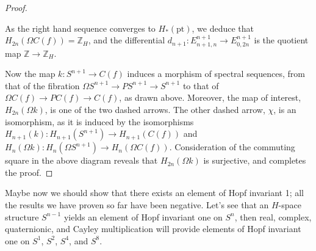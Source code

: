 \documentclass{article}
\newcommand{\Z}{\mathbb{Z}}
\newcommand{\ptspace}{\mathrm{pt}}
\newcommand{\Loops}{\Omega}
\begin{document}
\begin{proof}
\begin{center}
\end{center}
As the right hand sequence converges to $H_*(\ptspace)$, we deduce that $H_{2n}(\Omega C(f))=\Z_H$, and the differential $d_{n+1}:E^{n+1}_{n+1,n}\to E^{n+1}_{0,2n}$ is the quotient map $\Z\to\Z_H$. 

Now the map $k:S^{n+1}\to C(f)$ induces a morphism of spectral sequences,  from that of the fibration $\Loops S^{n+1} \to PS^{n+1} \to S^{n+1}$ to that of $\Loops C(f) \to PC(f) \to C(f)$, as drawn above. Moreover, the map of interest, $H_{2n}(\Omega k)$, is one of the two dashed arrows. The other dashed arrow, $\chi$, is an isomorphism, as it is induced by the isomorphisms $H_{n+1}(k):H_{n+1}(S^{n+1})\to H_{n+1}(C(f))$ and $H_{n}(\Omega k):H_n(\Omega S^{n+1})\to H_n(\Omega C(f))$. Consideration of the commuting square in the above diagram reveals that $H_{2n}(\Omega k)$ is surjective, and completes the proof.
\end{proof}

Maybe now we should show that there exists an element of Hopf invariant 1; all the results we have proven so far have been negative.  Let's see that an $H$-space structure $S^{n-1}$ yields an element of Hopf invariant one on $S^n$, then real, complex, quaternionic, and Cayley multiplication will provide elements of Hopf invariant one on $S^1$, $S^2$, $S^4$, and $S^8$.
\end{document}
